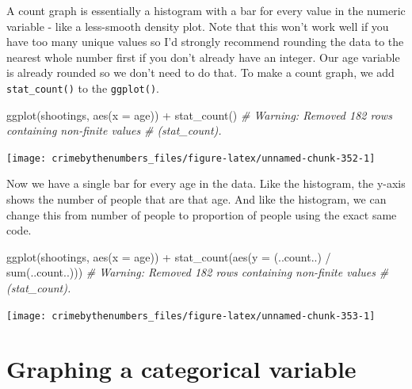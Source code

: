\documentclass[
  a4paper,
]{krantz}
\makeatletter
\newenvironment{Shaded}{\begin{snugshade}}{\end{snugshade}}
\newcommand{\AttributeTok}[1]{\textcolor[rgb]{0.77,0.63,0.00}{#1}}
\newcommand{\CommentTok}[1]{\textcolor[rgb]{0.56,0.35,0.01}{\textit{#1}}}
\newcommand{\FunctionTok}[1]{\textcolor[rgb]{0.00,0.00,0.00}{#1}}
\newcommand{\NormalTok}[1]{#1}
\newcommand{\SpecialCharTok}[1]{\textcolor[rgb]{0.00,0.00,0.00}{#1}}
\newenvironment{kframe}{%
\medskip{}
\setlength{\fboxsep}{.8em}
 \def\at@end@of@kframe{}%
 \ifinner\ifhmode%
  \def\at@end@of@kframe{\end{minipage}}%
  \begin{minipage}{\columnwidth}%
 \fi\fi%
 \def\FrameCommand##1{\hskip\@totalleftmargin \hskip-\fboxsep
 \colorbox{shadecolor}{##1}\hskip-\fboxsep
     \hskip-\linewidth \hskip-\@totalleftmargin \hskip\columnwidth}%
 \MakeFramed {\advance\hsize-\width
   \@totalleftmargin\z@ \linewidth\hsize
   \@setminipage}}%
 {\par\unskip\endMakeFramed%
 \at@end@of@kframe}
\renewenvironment{Shaded}{\begin{kframe}}{\end{kframe}}
\makeatother
\begin{document}
A count graph is essentially a histogram with a bar for
every value in the numeric variable - like a less-smooth
density plot. Note that this won't work well if you have too
many unique values so I'd strongly recommend rounding the
data to the nearest whole number first if you don't already
have an integer. Our age variable is already rounded so we
don't need to do that. To make a count graph, we add
\texttt{stat\_count()} to the \texttt{ggplot()}.

\begin{Shaded}
\begin{Highlighting}[]
\FunctionTok{ggplot}\NormalTok{(shootings, }\FunctionTok{aes}\NormalTok{(}\AttributeTok{x =}\NormalTok{ age)) }\SpecialCharTok{+}
  \FunctionTok{stat\_count}\NormalTok{()}
\CommentTok{\# Warning: Removed 182 rows containing non{-}finite values}
\CommentTok{\# (stat\_count).}
\end{Highlighting}
\end{Shaded}

\begin{center}\texttt{[image: crimebythenumbers\_files/figure-latex/unnamed-chunk-352-1]} \end{center}

Now we have a single bar for every age in the data. Like the
histogram, the y-axis shows the number of people that are
that age. And like the histogram, we can change this from
number of people to proportion of people using the exact
same code.

\begin{Shaded}
\begin{Highlighting}[]
\FunctionTok{ggplot}\NormalTok{(shootings, }\FunctionTok{aes}\NormalTok{(}\AttributeTok{x =}\NormalTok{ age)) }\SpecialCharTok{+}
  \FunctionTok{stat\_count}\NormalTok{(}\FunctionTok{aes}\NormalTok{(}\AttributeTok{y =}\NormalTok{ (..count..) }\SpecialCharTok{/} \FunctionTok{sum}\NormalTok{(..count..)))}
\CommentTok{\# Warning: Removed 182 rows containing non{-}finite values}
\CommentTok{\# (stat\_count).}
\end{Highlighting}
\end{Shaded}

\begin{center}\texttt{[image: crimebythenumbers\_files/figure-latex/unnamed-chunk-353-1]} \end{center}

\hypertarget{graphing-a-categorical-variable}{%
\section{Graphing a categorical
variable}\label{graphing-a-categorical-variable}}
\end{document}
